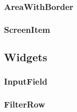 \subsubsection{AreaWithBorder}

\subsubsection{ScreenItem}

\subsection{Widgets}

\subsubsection{InputField}

\subsubsection{FilterRow}
\label{fig:FilterRow}